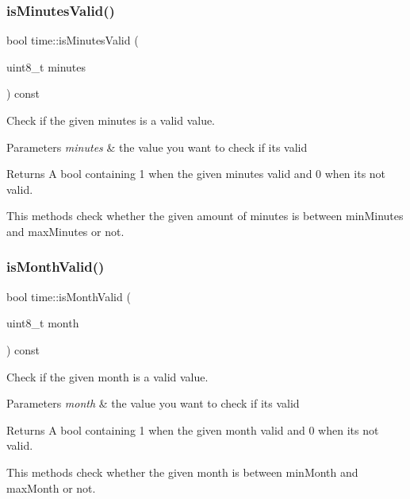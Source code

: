 \subsubsection{\texorpdfstring{is\+Minutes\+Valid()}{isMinutesValid()}}
{\footnotesize\ttfamily bool time\+::is\+Minutes\+Valid (\begin{DoxyParamCaption}\item[{uint8\+\_\+t}]{minutes }\end{DoxyParamCaption}) const}



Check if the given minutes is a valid value. 


\begin{DoxyParams}{Parameters}
{\em minutes} & the value you want to check if it\textquotesingle{}s valid \\
\hline
\end{DoxyParams}
\begin{DoxyReturn}{Returns}
A bool containing 1 when the given minutes valid and 0 when it\textquotesingle{}s not valid.
\end{DoxyReturn}
This methods check whether the given amount of minutes is between min\+Minutes and max\+Minutes or not. \mbox{\label{classtime_a92c265ce96b24f9bdfa960144a0bce11}} 
\subsubsection{\texorpdfstring{is\+Month\+Valid()}{isMonthValid()}}
{\footnotesize\ttfamily bool time\+::is\+Month\+Valid (\begin{DoxyParamCaption}\item[{uint8\+\_\+t}]{month }\end{DoxyParamCaption}) const}



Check if the given month is a valid value. 


\begin{DoxyParams}{Parameters}
{\em month} & the value you want to check if it\textquotesingle{}s valid \\
\hline
\end{DoxyParams}
\begin{DoxyReturn}{Returns}
A bool containing 1 when the given month valid and 0 when it\textquotesingle{}s not valid.
\end{DoxyReturn}
This methods check whether the given month is between min\+Month and max\+Month or not. \mbox{\label{classtime_aeba296b9c9c6ec09250f98a20062a500}} 
